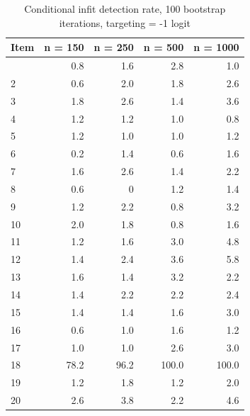 \documentclass[
  letterpaper,
  DIV=11,
  numbers=noendperiod]{scrartcl}
\begin{document}
\begin{longtable}[]{@{}lrrrr@{}}

\caption{\label{tbl-ifbresults1001}Conditional infit detection rate, 100
bootstrap iterations, targeting = -1 logit}

\tabularnewline

\toprule\noalign{}
Item & n = 150 & n = 250 & n = 500 & n = 1000 \\
\midrule\noalign{}
\endhead
\bottomrule\noalign{}
\endlastfoot
1 & 0.8 & 1.6 & 2.8 & 1.0 \\
2 & 0.6 & 2.0 & 1.8 & 2.6 \\
3 & 1.8 & 2.6 & 1.4 & 3.6 \\
4 & 1.2 & 1.2 & 1.0 & 0.8 \\
5 & 1.2 & 1.0 & 1.0 & 1.2 \\
6 & 0.2 & 1.4 & 0.6 & 1.6 \\
7 & 1.6 & 2.6 & 1.4 & 2.2 \\
8 & 0.6 & 0 & 1.2 & 1.4 \\
9 & 1.2 & 2.2 & 0.8 & 3.2 \\
10 & 2.0 & 1.8 & 0.8 & 1.6 \\
11 & 1.2 & 1.6 & 3.0 & 4.8 \\
12 & 1.4 & 2.4 & 3.6 & 5.8 \\
13 & 1.6 & 1.4 & 3.2 & 2.2 \\
14 & 1.4 & 2.2 & 2.2 & 2.4 \\
15 & 1.4 & 1.4 & 1.6 & 3.0 \\
16 & 0.6 & 1.0 & 1.6 & 1.2 \\
17 & 1.0 & 1.0 & 2.6 & 3.0 \\
18 & 78.2 & 96.2 & 100.0 & 100.0 \\
19 & 1.2 & 1.8 & 1.2 & 2.0 \\
20 & 2.6 & 3.8 & 2.2 & 4.6 \\

\end{longtable}
\end{document}
